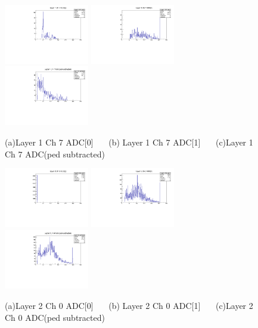 \documentclass[a4paper,11pt]{article}
\theoremstyle{mytheor}
\begin{document}
\begin{figure}[H] 
\vspace*{-0.3cm} 
\includegraphics[width=0.33\textwidth,scale=0.5,trim=0 0 0 0,clip]{plotsdir/file0_muons-Layer1_Ch7_adc0-1.pdf} 
\includegraphics[width=0.33\textwidth,scale=0.5,trim=0 0 0 0,clip]{plotsdir/file0_muons-Layer1_Ch7_adc1-1.pdf} 
\includegraphics[width=0.33\textwidth,scale=0.5,trim=0 0 0 0,clip]{plotsdir/file0_muons-Layer1_Ch7_adcPedsub-1.pdf} 
\caption{(a)Layer 1 Ch 7 ADC[0] ~~~(b) Layer 1 Ch 7 ADC[1] ~~~(c)Layer 1 Ch 7 ADC(ped subtracted) } 
\end{figure} 
\begin{figure}[H] 
\vspace*{-0.3cm} 
\includegraphics[width=0.33\textwidth,scale=0.5,trim=0 0 0 0,clip]{plotsdir/file0_muons-Layer2_Ch0_adc0-1.pdf} 
\includegraphics[width=0.33\textwidth,scale=0.5,trim=0 0 0 0,clip]{plotsdir/file0_muons-Layer2_Ch0_adc1-1.pdf} 
\includegraphics[width=0.33\textwidth,scale=0.5,trim=0 0 0 0,clip]{plotsdir/file0_muons-Layer2_Ch0_adcPedsub-1.pdf} 
\caption{(a)Layer 2 Ch 0 ADC[0] ~~~(b) Layer 2 Ch 0 ADC[1] ~~~(c)Layer 2 Ch 0 ADC(ped subtracted) } 
\end{figure} 
\end{document}

